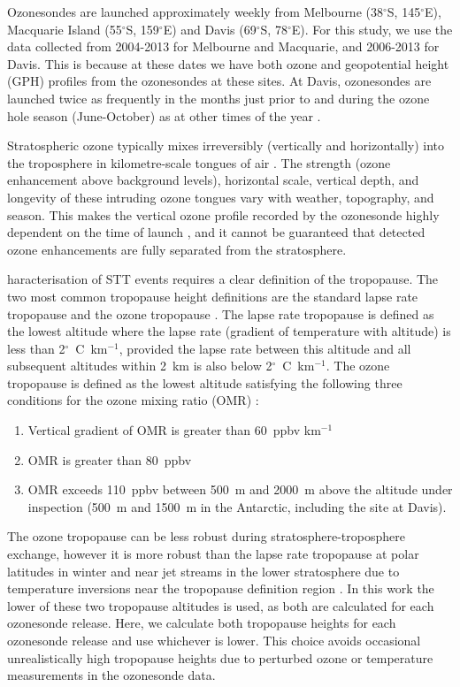 \documentclass{article}
\begin{document}
    Ozonesondes are launched approximately weekly from Melbourne (38$^{\circ}$S, 145$^{\circ}$E), Macquarie Island (55$^{\circ}$S, 159$^{\circ}$E) and Davis (69$^{\circ}$S, 78$^{\circ}$E). 
    For this study, we use the data collected from 2004-2013 for Melbourne and Macquarie, and 2006-2013 for Davis.
    This is because at these dates we have both ozone and geopotential height (GPH) profiles from the ozonesondes at these sites.
    At Davis, ozonesondes are launched twice as frequently in the months just prior to and during the ozone hole season (June-October) as at other times of the year \citep{Alexander2013}.
    
    Stratospheric ozone typically mixes irreversibly (vertically and horizontally) into the troposphere in kilometre-scale tongues of air \citep{Frey2015}.
    The strength (ozone enhancement above background levels), horizontal scale, vertical depth, and longevity of these intruding ozone tongues vary with weather, topography, and season.
    This makes the vertical ozone profile recorded by the ozonesonde highly dependent on the time of launch \citep{Sprenger2003}, and it cannot be guaranteed that detected ozone enhancements are fully separated from the stratosphere.
    
    haracterisation of STT events requires a clear definition of the tropopause.
    The two most common tropopause height definitions are the standard lapse rate tropopause \citep{WMO1957} and the ozone tropopause \citep{Bethan1996}.
    The lapse rate tropopause is defined as the lowest altitude where the lapse rate (gradient of temperature with altitude) is less than 2$^\circ$~C~km$^{-1}$, provided the lapse rate between this altitude and all subsequent altitudes within 2~km is also below 2$^\circ$~C~km$^{-1}$.
    The ozone tropopause is defined as the lowest altitude satisfying the following three conditions for the ozone mixing ratio (OMR)  \citep{Bethan1996}:
    \begin{enumerate}
      \item Vertical gradient of OMR is greater than 60~ppbv km$^{-1}$
      \item OMR is greater than 80~ppbv
      \item OMR exceeds 110~ppbv between 500~m and 2000~m above the altitude under inspection (500~m and 1500~m in the Antarctic, including the site at Davis).
    \end{enumerate}
    The ozone tropopause can be less robust during stratosphere-troposphere exchange, however it is more robust than the lapse rate tropopause at polar latitudes in winter and near jet streams in the lower stratosphere due to temperature inversions near the tropopause definition region \citep{Bethan1996, Tomikawa2009, Alexander2013}.
    In this work the lower of these two tropopause altitudes is used, as both are calculated for each ozonesonde release.
    Here, we calculate both tropopause heights for each ozonesonde release and use whichever is lower.
    This choice avoids occasional unrealistically high tropopause heights due to perturbed ozone or temperature measurements in the ozonesonde data.
    
\end{document}
